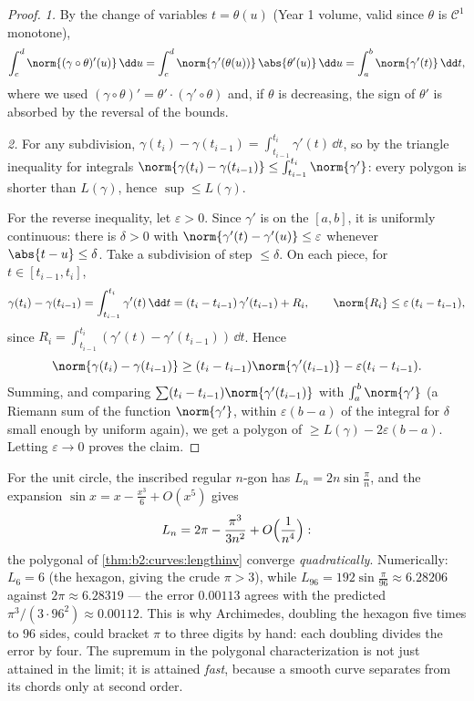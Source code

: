 \begin{proof}
\emph{1.} By the change of variables $t = \theta(u)$ (Year 1
volume, valid since $\theta$ is $\mathcal{C}^1$ monotone),
\[
\int_c^d \norm{(\gamma\circ\theta)'(u)}\,\dd u
= \int_c^d \norm{\gamma'(\theta(u))}\,\abs{\theta'(u)}\,\dd u
= \int_a^b \norm{\gamma'(t)}\,\dd t ,
\]
where we used $(\gamma\circ\theta)' = \theta'\cdot
(\gamma'\circ\theta)$ and, if $\theta$ is decreasing, the sign of
$\theta'$ is absorbed by the reversal of the bounds.

\emph{2.} For any subdivision, $\gamma(t_i) - \gamma(t_{i-1}) =
\int_{t_{i-1}}^{t_i}\gamma'(t)\,\dd t$, so by the triangle
inequality for integrals $\norm{\gamma(t_i) - \gamma(t_{i-1})}
\leq \int_{t_{i-1}}^{t_i}\norm{\gamma'}$: every polygon is shorter
than $L(\gamma)$, hence $\sup \leq L(\gamma)$.

For the reverse inequality, let $\varepsilon > 0$. Since $\gamma'$
is  on the  $[a,b]$, it is uniformly continuous:
there is $\delta > 0$ with $\norm{\gamma'(t) - \gamma'(u)} \leq
\varepsilon$ whenever $\abs{t - u} \leq \delta$. Take a subdivision
of step $\leq \delta$. On each piece, for $t \in [t_{i-1}, t_i]$,
\[
\gamma(t_i) - \gamma(t_{i-1})
= \int_{t_{i-1}}^{t_i}\gamma'(t)\,\dd t
= (t_i - t_{i-1})\,\gamma'(t_{i-1}) + R_i,
\qquad
\norm{R_i} \leq \varepsilon\,(t_i - t_{i-1}),
\]
since $R_i = \int_{t_{i-1}}^{t_i}(\gamma'(t) -
\gamma'(t_{i-1}))\,\dd t$. Hence
\[
\norm{\gamma(t_i) - \gamma(t_{i-1})}
\geq (t_i - t_{i-1})\norm{\gamma'(t_{i-1})}
- \varepsilon (t_i - t_{i-1}) .
\]
Summing, and comparing $\sum (t_i -
t_{i-1})\norm{\gamma'(t_{i-1})}$ with $\int_a^b\norm{\gamma'}$ (a
Riemann sum of the  function $\norm{\gamma'}$, within
$\varepsilon(b - a)$ of the integral for $\delta$ small enough by
uniform  again), we get a polygon of  $\geq
L(\gamma) - 2\varepsilon(b - a)$. Letting $\varepsilon \to 0$
proves the claim.
\end{proof}

\begin{example}\label{ex:b2:curves:archimedes}
For the unit circle, the inscribed regular $n$-gon has 
$L_n = 2n\sin\frac\pi n$, and the expansion $\sin x = x -
\frac{x^3}6 + O(x^5)$ gives
\[
L_n = 2\pi - \frac{\pi^3}{3n^2} + O\Bigl(\frac1{n^4}\Bigr) :
\]
the polygonal  of \cref{thm:b2:curves:lengthinv}
converge \emph{quadratically}. Numerically: $L_6 = 6$
(the hexagon, giving the crude $\pi > 3$), while $L_{96} =
192\sin\frac{\pi}{96} \approx 6.28206$ against $2\pi \approx
6.28319$ --- the error $0.00113$ agrees with the predicted
$\pi^3/(3\cdot96^2) \approx 0.00112$. This is why Archimedes,
doubling the hexagon five times to $96$ sides, could bracket
$\pi$ to three digits by hand: each doubling divides the
error by four. The supremum in the polygonal
characterization is not just attained in the limit; it is
attained \emph{fast}, because a smooth curve separates from
its chords only at second order.
\end{example}

